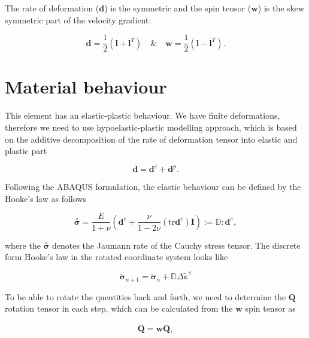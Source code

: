 \documentclass[12pt,a4paper]{article}
\begin{document}
The rate of deformation ($\boldsymbol{d}$) is the symmetric and the spin tensor ($\boldsymbol{w}$) is the skew symmetric part of the velocity gradient:

\begin{equation}
    \boldsymbol{d} = \frac{1}{2}(\boldsymbol{l}+\boldsymbol{l}^T) \quad\&\quad \boldsymbol{w} = \frac{1}{2}(\boldsymbol{l}-\boldsymbol{l}^T).
\end{equation}  

\section*{Material behaviour}

This element has an elastic-plastic behaviour. We have finite deformations, therefore we need to use hypoelastic-plastic modelling approach, which is based on the additive decomposition of the rate of deformation tensor into elastic and plastic part

\begin{equation}
    \boldsymbol{d} = \boldsymbol{d}^e + \boldsymbol{d}^p.
\end{equation}  

Following the ABAQUS formulation, the elastic behaviour can be defined by the Hooke's law as follows

\begin{equation}
    \overset{\circ}{\boldsymbol{\sigma}}  = \frac{E}{1+\nu}\left(\boldsymbol{d}^e+\frac{\nu}{1-2\nu}(\text{tr}\boldsymbol{d}^e)\boldsymbol{I}\right) := \mathbb{D} : \boldsymbol{d}^e,
\end{equation}

where the $\overset{\circ}{\boldsymbol{\sigma}}$ denotes the Jaumann rate of the Cauchy stress tensor. The discrete form Hooke's law in the rotated coordinate system looks like 

\begin{equation}
    \tilde{\boldsymbol{\sigma}}_{n+1}  = \tilde{\boldsymbol{\sigma}}_{n} + 
    \mathbb{D} \Delta\tilde{\boldsymbol{\varepsilon}}^e
\end{equation}

To be able to rotate the quentities back and forth, we need to determine the $\boldsymbol{Q}$ rotation tensor in each step, which can be calculated from the $\boldsymbol{w}$ spin tensor as

\begin{equation}
    \dot{\boldsymbol{Q}} = \boldsymbol{w}\boldsymbol{Q},
\end{equation}
\end{document}
